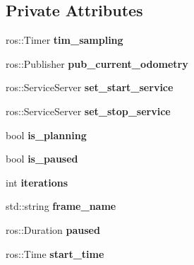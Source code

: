\subsection*{Private Attributes}
\begin{DoxyCompactItemize}
\item 
ros\+::\+Timer {\bfseries tim\+\_\+sampling}\hypertarget{classPlanner_a8dd2352bf15aef91d49337d95dfe6b04}{}\label{classPlanner_a8dd2352bf15aef91d49337d95dfe6b04}

\item 
ros\+::\+Publisher {\bfseries pub\+\_\+current\+\_\+odometry}\hypertarget{classPlanner_a1eea64fbf5b532bedd2f5a20eaedb4d8}{}\label{classPlanner_a1eea64fbf5b532bedd2f5a20eaedb4d8}

\item 
ros\+::\+Service\+Server {\bfseries set\+\_\+start\+\_\+service}\hypertarget{classPlanner_ad3cb4222b988ec69a5b89e1c67b119cd}{}\label{classPlanner_ad3cb4222b988ec69a5b89e1c67b119cd}

\item 
ros\+::\+Service\+Server {\bfseries set\+\_\+stop\+\_\+service}\hypertarget{classPlanner_a9211a5e71956ef94e1306adcabb2e51d}{}\label{classPlanner_a9211a5e71956ef94e1306adcabb2e51d}

\item 
bool {\bfseries is\+\_\+planning}\hypertarget{classPlanner_afcb5f703c4d2a54bb8c8f8360864b763}{}\label{classPlanner_afcb5f703c4d2a54bb8c8f8360864b763}

\item 
bool {\bfseries is\+\_\+paused}\hypertarget{classPlanner_a247ba912994c9035473b9ee037aac307}{}\label{classPlanner_a247ba912994c9035473b9ee037aac307}

\item 
int {\bfseries iterations}\hypertarget{classPlanner_a19220ea8cd70f4f3bfa3e35e1250ed00}{}\label{classPlanner_a19220ea8cd70f4f3bfa3e35e1250ed00}

\item 
std\+::string {\bfseries frame\+\_\+name}\hypertarget{classPlanner_a1578a9b87a63d6a806ab46a863ec55cb}{}\label{classPlanner_a1578a9b87a63d6a806ab46a863ec55cb}

\item 
ros\+::\+Duration {\bfseries paused}\hypertarget{classPlanner_a0e99faac21bce026cb9b0b576b734c71}{}\label{classPlanner_a0e99faac21bce026cb9b0b576b734c71}

\item 
ros\+::\+Time {\bfseries start\+\_\+time}\hypertarget{classPlanner_ade39963b5d3f74b75feed62ab669979e}{}\label{classPlanner_ade39963b5d3f74b75feed62ab669979e}


\end{DoxyCompactItemize}
